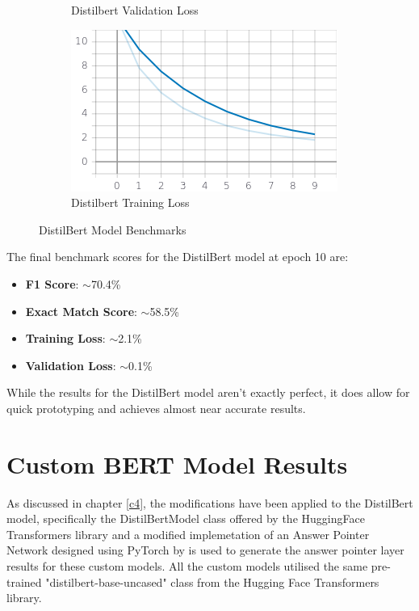 \documentclass[a4paper,12pt]{report}
\begin{document}
\begin{figure}
\begin{subfigure}[b]{0.4\textwidth}
		\caption{\small Distilbert Validation Loss}
		\label{distilbertValLoss}
	\end{subfigure}
	\hfill
	\begin{subfigure}[b]{0.4\textwidth}
		\centering
		\includegraphics[width=\textwidth]{../images/Distilbert_Train_Loss.png}
		\caption{\small Distilbert Training Loss}
		\label{distilbertTrainloss}
	\end{subfigure}
	\caption{DistilBert Model Benchmarks}
	\label{distilbertBenchmarks}
\end{figure}

	The final benchmark scores for the DistilBert model at epoch 10 are:
\begin{itemize}
	\item \textbf{F1 Score}:  $\sim$70.4\%
	\item \textbf{Exact Match Score}: $\sim$58.5\%
	\item \textbf{Training Loss}:  $\sim$2.1\%
	\item \textbf{Validation Loss}: $\sim$0.1\%
\end{itemize}

While the results for the DistilBert model aren't exactly perfect, it does allow for quick prototyping and achieves almost near accurate results.


\section{Custom BERT Model Results}\label{c52}

	As discussed in chapter \ref{c4}, the modifications have been applied to the DistilBert model, specifically the DistilBertModel class offered by the HuggingFace Transformers library \citep{hfTransformers} and a modified implemetation of an Answer Pointer Network designed using PyTorch by \citep{pointernetGit} is used to generate the answer pointer layer results for these custom models. All the custom models utilised the same pre-trained "distilbert-base-uncased" class from the Hugging Face Transformers library.
\end{document}

